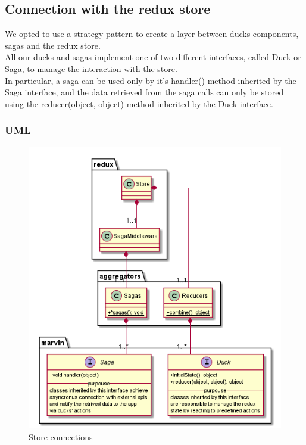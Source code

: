 
	\subsection{Connection with the redux store}
	We opted to use a strategy pattern to create a layer between ducks components, sagas and the redux store.\\
	All our ducks and sagas implement one of two different interfaces, called Duck or Saga, to manage the interaction with the store.\\
	In particular, a saga can be used only by it's handler() method inherited by the Saga interface,
	and the data retrieved from the saga calls can only be stored using the reducer(object, object) method inherited by the Duck interface.
	\subsubsection{UML}
	\begin{figure}[H]
		\centering
		\includegraphics[width=0.5\linewidth]{"diagrammi/redux/store connection"}
		\caption{Store connections}
		\label{fig:Store connections}
	\end{figure}
	
